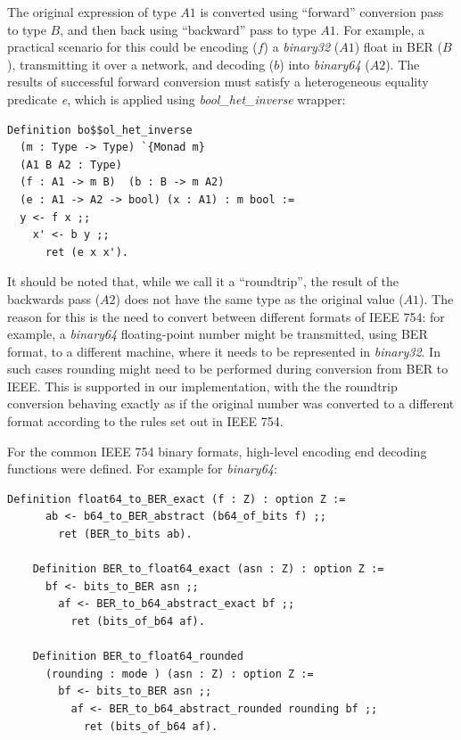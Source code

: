 \documentclass[sigplan]{acmart}
\begin{document}
The original expression of type $A1$ is converted using ``forward'' conversion
pass to type $B$, and then back using ``backward'' pass to type $A1$. For example, a practical scenario for this could be encoding ($f$) a \emph{binary32} ($A1$) float in BER ($B$), transmitting it over a network, and decoding ($b$) into \emph{binary64} ($A2$). The results
of successful forward conversion must satisfy a heterogeneous equality
predicate \emph{e}, which is applied using  \emph{bool\_het\_inverse} wrapper:

\begin{lstlisting}[language=Coq, mathescape=true,
  basicstyle=\footnotesize]
Definition bo$$ol_het_inverse
  (m : Type -> Type) `{Monad m}
  (A1 B A2 : Type)
  (f : A1 -> m B)  (b : B -> m A2)
  (e : A1 -> A2 -> bool) (x : A1) : m bool := 
  y <- f x ;;
    x' <- b y ;;
      ret (e x x').
\end{lstlisting}

It should be noted that, while we call it a ``roundtrip'', the result
of the backwards pass ($A2$) does not have the same type as the original value ($A1$).
The reason for this is the need to convert between different formats of IEEE 754: for
example, a \emph{binary64} floating-point number might be transmitted, using BER format,
to a different machine, where it needs to be represented in \emph{binary32}.
In such cases rounding might need to be performed during conversion from BER to IEEE.
This is supported in our implementation, with the the roundtrip conversion behaving exactly as if the
original number was converted to a different format according to the rules set out in
IEEE 754.

For the common IEEE 754 binary formats, high-level encoding end decoding functions were defined. For example for \emph{binary64}:

\begin{lstlisting}[language=Coq, mathescape=true,
  basicstyle=\footnotesize]
    Definition float64_to_BER_exact (f : Z) : option Z :=
      ab <- b64_to_BER_abstract (b64_of_bits f) ;;
        ret (BER_to_bits ab).

    Definition BER_to_float64_exact (asn : Z) : option Z :=
      bf <- bits_to_BER asn ;;
        af <- BER_to_b64_abstract_exact bf ;;
          ret (bits_of_b64 af).

    Definition BER_to_float64_rounded
      (rounding : mode ) (asn : Z) : option Z :=
        bf <- bits_to_BER asn ;;
          af <- BER_to_b64_abstract_rounded rounding bf ;;
            ret (bits_of_b64 af).
\end{lstlisting}
\end{document}
